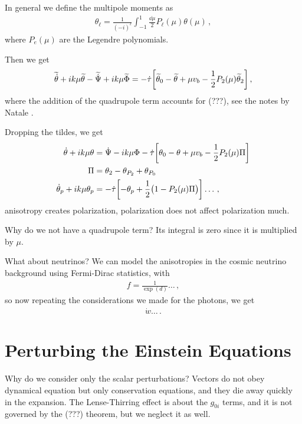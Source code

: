 \documentclass[main.tex]{subfiles}
\begin{document}
In general we define the multipole moments as 
%
\begin{align}
\theta_{\ell} = \frac{1}{(-i)^{\ell}} \int_{-1}^{1} \frac{ \dd{\mu }}{2} P_\ell (\mu ) \theta(\mu )
\,,
\end{align}
%
where \(P_e (\mu )\) are the Legendre polynomials. 

Then we get 
%
\begin{align}
\widetilde{\dot{\theta}} + ik \mu \widetilde{\theta} - \widetilde{\dot{\Psi}}
+ ik \mu \widetilde{\Phi} =
-\dot{\tau} \qty[\widetilde{\theta}_{0} - \widetilde{\theta} 
+ \mu v_b - \frac{1}{2} P_2 (\mu ) \widetilde{\theta}_{2}] 
\,,
\end{align}
%
where the addition of the quadrupole term accounts for (???), see the notes by Natale \cite[]{nataleNoteCorsoDi2017}. 

Dropping the tildes, we get 
%
\begin{subequations}
\begin{align}
\dot{\theta} + ik \mu \theta &= \dot{\Psi} - ik \mu \Phi - \dot{\tau} \qty[\theta_0 - \theta + \mu v_b - \frac{1}{2} P_2 (\mu ) \Pi ]  \\
\Pi &= \theta_2 - \theta_{P_2 } + \theta_{P_0 }  \\
\dot{\theta}_{p} + i k \mu \theta_{p} &= - \dot{\tau} \qty[- \theta_{p} + \frac{1}{2} \qty(1 - P_2 (\mu ) \Pi )] \dots
\,,
\end{align}
\end{subequations}
%
anisotropy creates polarization, polarization does not affect polarization much. 

Why do we not have a quadrupole term? Its integral is zero since it is multiplied by \(\mu \). 

What about neutrinos? 
We can model the anisotropies in the cosmic neutrino background using Fermi-Dirac statistics, with 
%
\begin{align}
f = \frac{1}{\exp(d)} \dots
\,,
\end{align}
%
so now repeating the considerations we made for the photons, we get 
%
\begin{align}
\dot{w} \dots
\,.
\end{align}

\section{Perturbing the Einstein Equations}

Why do we consider only the scalar perturbations? Vectors do not obey dynamical equation but only conservation equations, and they die away quickly in the expansion. 
The Lense-Thirring effect is about the \(g_{0i}\) terms, and it is not governed by the (???) theorem, but we neglect it as well. 
\end{document}

